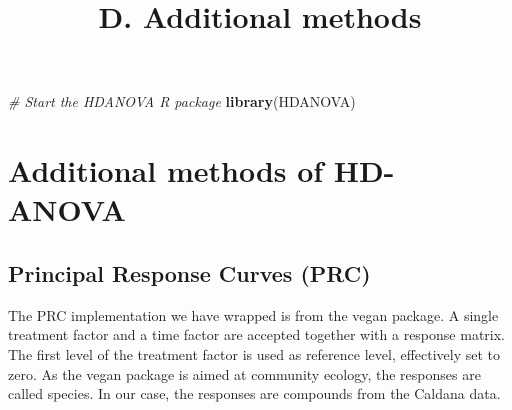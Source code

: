 \documentclass[
]{article}
\title{D. Additional methods}
\author{}
\date{\vspace{-2.5em}}
\newenvironment{Shaded}{\begin{snugshade}}{\end{snugshade}}
\newcommand{\CommentTok}[1]{\textcolor[rgb]{0.56,0.35,0.01}{\textit{#1}}}
\newcommand{\FunctionTok}[1]{\textcolor[rgb]{0.13,0.29,0.53}{\textbf{#1}}}
\newcommand{\NormalTok}[1]{#1}
\begin{document}
\maketitle

\begin{Shaded}
\begin{Highlighting}[]
\CommentTok{\# Start the HDANOVA R package}
\FunctionTok{library}\NormalTok{(HDANOVA)}
\end{Highlighting}
\end{Shaded}

\hypertarget{additional-methods-of-hd-anova}{%
\section{Additional methods of
HD-ANOVA}\label{additional-methods-of-hd-anova}}

\hypertarget{principal-response-curves-prc}{%
\subsection{Principal Response Curves
(PRC)}\label{principal-response-curves-prc}}

The PRC implementation we have wrapped is from the vegan package. A
single treatment factor and a time factor are accepted together with a
response matrix. The first level of the treatment factor is used as
reference level, effectively set to zero. As the vegan package is aimed
at community ecology, the responses are called species. In our case, the
responses are compounds from the Caldana data.
\end{document}
